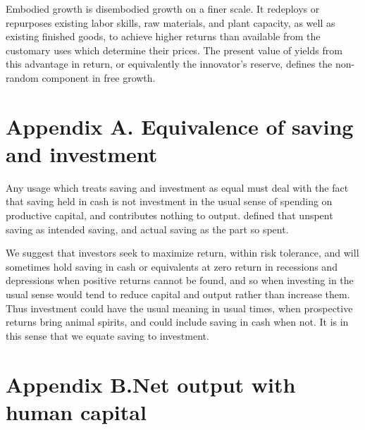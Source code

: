 Embodied growth is disembodied growth on a finer scale. It redeploys or
repurposes existing labor skills, raw materials, and plant capacity, as
well as existing finished goods, to achieve higher returns than
available from the customary uses which determine their prices. The
present value of yields from this advantage in return, or equivalently
the innovator's reserve, defines the non-random component in free growth.

\appendix
\renewcommand{\theequation}{A.\arabic{equation}}
\setcounter{equation}{0}

\hypertarget{appendix-a}{
\section*{Appendix A. \hspace{0.5em}Equivalence of saving and investment}\label{appendix-a}
}

Any usage which treats saving and investment as equal must deal with the fact that saving held in cash is not investment in the usual sense of spending on productive capital, and contributes nothing to output. \cite{keynesGeneralTheoryEmployment1936} defined that unspent saving as intended saving, and actual saving as the part so spent.

We suggest that investors seek to maximize return, within risk tolerance, and will sometimes hold saving in cash or equivalents at zero return in recessions and depressions when positive returns cannot be found, and so when investing in the usual sense would tend to reduce capital and output rather than increase them. Thus investment could have the usual meaning in usual times, when prospective returns bring animal spirits, and could include saving in cash when not. It is in this sense that we equate saving to investment.

\renewcommand{\theequation}{B.\arabic{equation}}
\setcounter{equation}{0}

\hypertarget{appendix}{%
\section*{Appendix B.\hspace{0.5em}Net output with human
capital}\label{appendix}}


